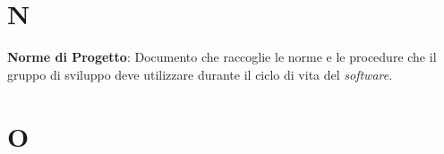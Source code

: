 \documentclass[5pt]{article}
\begin{document}
\pagebreak

\section*{N}
\begin{flushleft}

\textbf{Norme di Progetto}: Documento che raccoglie le norme e le procedure che il gruppo di sviluppo deve utilizzare durante il ciclo di vita del \textit{software}.

\end{flushleft}

\pagebreak

\section*{O}
\begin{flushleft}
	
\end{flushleft}

\pagebreak
\end{document}
